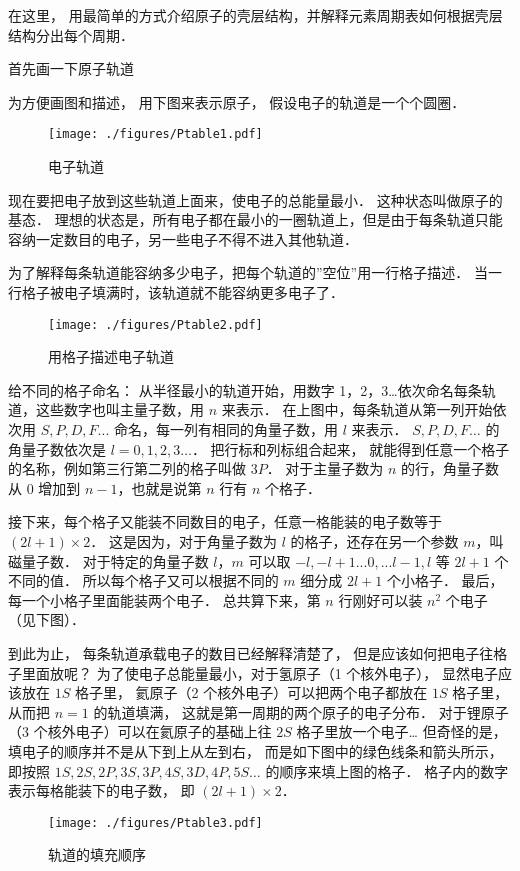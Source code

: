 
在这里， 用最简单的方式介绍原子的壳层结构，并解释元素周期表如何根据壳层结构分出每个周期．

首先画一下原子轨道

为方便画图和描述， 用下图来表示原子， 假设电子的轨道是一个个圆圈．
\begin{figure}[ht]
\centering
\texttt{[image: ./figures/Ptable1.pdf]}
\caption{电子轨道} 
\end{figure}
现在要把电子放到这些轨道上面来，使电子的总能量最小． 这种状态叫做原子的基态． 理想的状态是，所有电子都在最小的一圈轨道上，但是由于每条轨道只能容纳一定数目的电子，另一些电子不得不进入其他轨道．

为了解释每条轨道能容纳多少电子，把每个轨道的”空位”用一行格子描述． 当一行格子被电子填满时，该轨道就不能容纳更多电子了．
\begin{figure}[ht]
\centering
\texttt{[image: ./figures/Ptable2.pdf]}
\caption{用格子描述电子轨道} 
\end{figure}
给不同的格子命名： 从半径最小的轨道开始，用数字 1，2，3…依次命名每条轨道，这些数字也叫主量子数，用 $n$ 来表示． 在上图中，每条轨道从第一列开始依次用 $S,P,D,F...$ 命名，每一列有相同的角量子数，用 $l$ 来表示．  $S,P,D,F\dots$ 的角量子数依次是 $l = 0,1,2,3\dots$． 把行标和列标组合起来， 就能得到任意一个格子的名称，例如第三行第二列的格子叫做 $3P$． 对于主量子数为 $n$ 的行，角量子数从 0 增加到 $n-1$，也就是说第 $n$ 行有 $n$ 个格子．

接下来，每个格子又能装不同数目的电子，任意一格能装的电子数等于 $(2l + 1) \times 2$． 这是因为，对于角量子数为 $l$ 的格子，还存在另一个参数 $m$，叫磁量子数． 对于特定的角量子数 $l$，$m$ 可以取 $ - l, - l + 1...0,...l - 1,l$ 等 $2l + 1$ 个不同的值． 所以每个格子又可以根据不同的 $m$ 细分成 $2l+1$ 个小格子． 最后， 每一个小格子里面能装两个电子． 总共算下来，第 $n$ 行刚好可以装 $n^2$ 个电子（见下图）．

到此为止， 每条轨道承载电子的数目已经解释清楚了， 但是应该如何把电子往格子里面放呢？ 为了使电子总能量最小，对于氢原子（1 个核外电子）， 显然电子应该放在 $1S$ 格子里， 氦原子（2 个核外电子）可以把两个电子都放在 $1S$ 格子里， 从而把 $n=1$ 的轨道填满， 这就是第一周期的两个原子的电子分布． 对于锂原子（3 个核外电子）可以在氦原子的基础上往 $2S$ 格子里放一个电子… 但奇怪的是， 填电子的顺序并不是从下到上从左到右， 而是如下图中的绿色线条和箭头所示， 即按照 $1S, 2S, 2P, 3S, 3P, 4S, 3D, 4P, 5S…$ 的顺序来填上图的格子． 格子内的数字表示每格能装下的电子数， 即 $(2l + 1) \times 2$．
\begin{figure}[ht]
\centering
\texttt{[image: ./figures/Ptable3.pdf]}
\caption{轨道的填充顺序} 
\end{figure}

